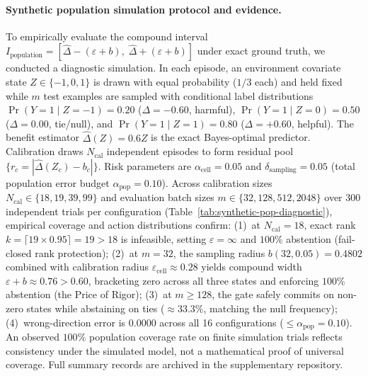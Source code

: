 \paragraph{Synthetic population simulation protocol and evidence.}
To empirically evaluate the compound interval $I_{\mathrm{population}} = [\widehat\Delta - (\varepsilon + b), \; \widehat\Delta + (\varepsilon + b)]$
under exact ground truth, we conducted a diagnostic simulation.
In each episode, an environment covariate state $Z \in \{-1, 0, 1\}$ is drawn with equal probability ($1/3$ each) and held fixed while $m$ test examples are sampled with conditional label distributions
$\Pr(Y=1 \mid Z=-1)=0.20$ ($\Delta = -0.60$, harmful), $\Pr(Y=1 \mid Z=0)=0.50$ ($\Delta = 0.00$, tie/null), and $\Pr(Y=1 \mid Z=1)=0.80$ ($\Delta = +0.60$, helpful).
The benefit estimator $\widehat\Delta(Z) = 0.6Z$ is the exact Bayes-optimal predictor.
Calibration draws $N_{\mathrm{cal}}$ independent episodes to form residual pool $\{r_c = |\widehat\Delta(Z_c) - b_c|\}$.
Risk parameters are $\alpha_{\mathrm{cell}} = 0.05$ and $\delta_{\mathrm{sampling}} = 0.05$ (total population error budget $\alpha_{\mathrm{pop}} = 0.10$).
Across calibration sizes $N_{\mathrm{cal}} \in \{18, 19, 39, 99\}$ and evaluation batch sizes $m \in \{32, 128, 512, 2048\}$ over 300 independent trials per configuration
(Table~\ref{tab:synthetic-pop-diagnostic}), empirical coverage and action distributions confirm:
(1)~at $N_{\mathrm{cal}}=18$, exact rank $k = \lceil 19 \times 0.95 \rceil = 19 > 18$ is infeasible, setting $\varepsilon = \infty$ and $100\%$ abstention (fail-closed rank protection);
(2)~at $m=32$, the sampling radius $b(32, 0.05) = 0.4802$ combined with calibration radius $\varepsilon_{\mathrm{cell}} \approx 0.28$ yields compound width $\varepsilon + b \approx 0.76 > 0.60$, bracketing zero across all three states and enforcing $100\%$ abstention (the Price of Rigor);
(3)~at $m \ge 128$, the gate safely commits on non-zero states while abstaining on ties ($\approx 33.3\%$, matching the null frequency);
(4)~wrong-direction error is $0.0000$ across all 16 configurations ($\le \alpha_{\mathrm{pop}} = 0.10$).
An observed $100\%$ population coverage rate on finite simulation trials reflects consistency under the simulated model, not a mathematical proof of universal coverage.
Full summary records are archived in the supplementary repository.

